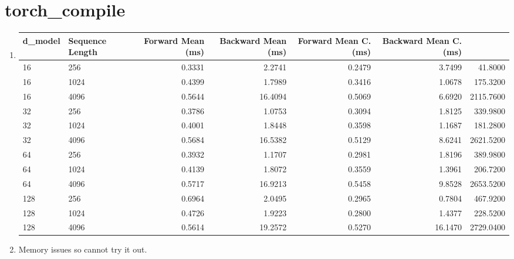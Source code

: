\documentclass{article}
\begin{document}
\section{torch\_compile}
\begin{enumerate}
\item
\begin{table}[h!]
\centering
\label{tab:benchmark}
\begin{tabular}{llrrrrr}
\toprule
d\_model & Sequence Length & Forward Mean (ms) & Backward Mean (ms) & Forward Mean C. (ms) & Backward Mean C. (ms) &  \\
\midrule
16 & 256 & 0.3331 & 2.2741 &  0.2479 & 3.7499 & 41.8000 \\
16 & 1024 & 0.4399 & 1.7989 & 0.3416 & 1.0678 & 175.3200 \\
16 & 4096 & 0.5644 & 16.4094 & 0.5069 & 6.6920 & 2115.7600 \\
32 & 256 & 0.3786 & 1.0753 &  0.3094 & 1.8125 & 339.9800 \\
32 & 1024 & 0.4001 & 1.8448 & 0.3598 & 1.1687 & 181.2800 \\
32 & 4096 & 0.5684 & 16.5382 & 0.5129 & 8.6241 & 2621.5200 \\
64 & 256 & 0.3932 & 1.1707 &  0.2981 & 1.8196 & 389.9800 \\
64 & 1024 & 0.4139 & 1.8072 & 0.3559 & 1.3961 & 206.7200 \\
64 & 4096 & 0.5717 & 16.9213 & 0.5458 & 9.8528 & 2653.5200 \\
128 & 256 & 0.6964 & 2.0495 & 0.2965 & 0.7804 & 467.9200 \\
128 & 1024 & 0.4726 & 1.9223  & 0.2800 & 1.4377 & 228.5200 \\
128 & 4096 & 0.5614 & 19.2572 & 0.5270 & 16.1470 & 2729.0400 \\
\bottomrule
\end{tabular}
\end{table}

\item
Memory issues so cannot try it out.

\end{enumerate}
\end{document}
